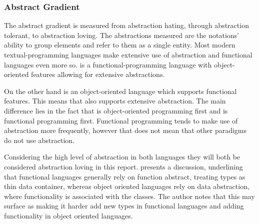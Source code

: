 \subsubsection{Abstract Gradient}
The abstract gradient is measured from abstraction hating, through abstraction tolerant, to abstraction loving. The abstractions measured are the notations' ability to group elements and refer to them as a single entity. Most modern textual-programming languages make extensive use of abstraction and functional languages even more so\cite{hudak1989conception}. \fs is a functional-programming language with object-oriented features allowing for extensive abstractions.

On the other hand \cs is an object-oriented language which supports functional features. This means that \cs also supports extensive abstraction. The main difference lies in the fact that \cs is object-oriented programming first and \fs is functional programming first. Functional programming tends to make use of abstraction more frequently, however that does not mean that other paradigms do not use abstraction\needcite.

Considering the high level of abstraction in both languages they will both be considered abstraction loving in this report. \cite{bendersky:abstraction} presents a discussion, underlining that functional languages generally rely on function abstract, treating types as thin data container, whereas object oriented languages rely on data abstraction, where functionality is associated with the classes. The author notes that this may surface as making it harder add new types in functional languages and adding functionality in object oriented languages.
